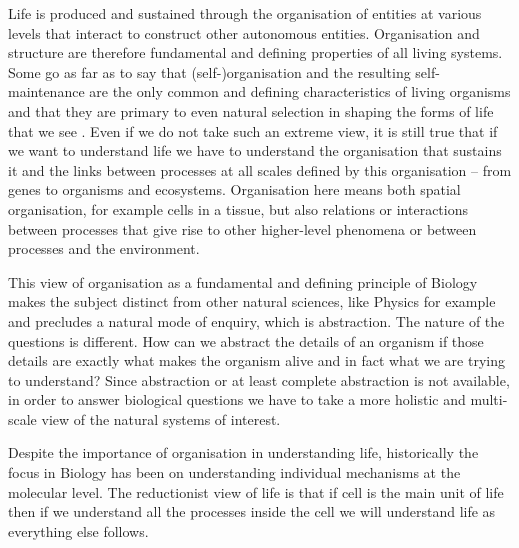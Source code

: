 Life is produced and sustained through the organisation of entities at various
levels that interact to construct other autonomous entities. Organisation and
structure are therefore fundamental and defining properties of all living
systems. Some go as far as to say that (self-)organisation and the resulting
self-maintenance are the only common and defining characteristics of living
organisms and that they are primary to even natural selection in shaping the
forms of life that we see \citep[sometimes referred to as structuralism, for
example;][]{thompson1942growth, kauffman1992origins}. Even if we do not take
such an extreme view, it is still true that if we want to understand life we
have to understand the organisation that sustains it and the links between
processes at all scales defined by this organisation -- from genes to organisms
and ecosystems. Organisation here means both spatial organisation, for example
cells in a tissue, but also relations or interactions between processes that
give rise to other higher-level phenomena or between processes and the
environment.

This view of organisation as a fundamental and defining principle of Biology
makes the subject distinct from other natural sciences, like Physics for example
and precludes a natural mode of enquiry, which is abstraction. The nature of the
questions is different. How can we abstract the details of an organism if those
details are exactly what makes the organism alive and in fact what we are trying
to understand? Since abstraction or at least complete abstraction is not
available, in order to answer biological questions we have to take a more
holistic and multi-scale view of the natural systems of interest.

Despite the importance of organisation in understanding life, historically the
focus in Biology has been on understanding individual mechanisms at the
molecular level. The reductionist view of life is that if cell is the main unit
of life then if we understand all the processes inside the cell we will
understand life as everything else follows.

